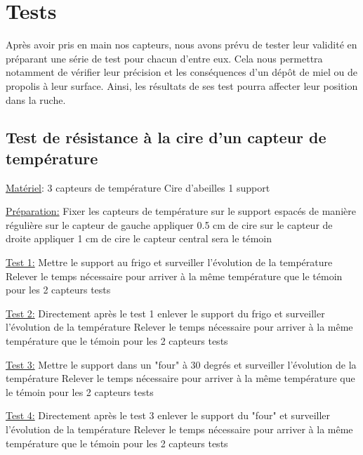 \chapter{Tests}

Après avoir pris en main nos capteurs, nous avons prévu de tester leur validité en préparant une série de test pour chacun d'entre eux. Cela nous permettra notamment de vérifier leur précision et les conséquences d'un dépôt de miel ou de propolis à leur surface. Ainsi, les résultats de ses test pourra affecter leur position dans la ruche. 

\section{Test de résistance à la cire d'un capteur de température}

\noindent \underline{Matériel}:  
3 capteurs de température  
Cire d'abeilles  
1 support\newline  

\noindent \underline{Préparation:} \newline 
Fixer les capteurs de température sur le support espacés de manière régulière sur le capteur de gauche appliquer 0.5 cm de cire sur le capteur de droite appliquer 1 cm de cire le capteur central sera le témoin \newline

\noindent \underline{Test 1:} \newline 
Mettre le support au frigo et surveiller l'évolution de la température\newline   
Relever le temps nécessaire pour arriver à la même température que le témoin pour les 2 capteurs tests  

\noindent \underline{Test 2:}  \newline 
Directement après le test 1 enlever le support du frigo et surveiller l'évolution de la température\newline   
Relever le temps nécessaire pour arriver à la même température que le témoin pour les 2 capteurs tests

\noindent \underline{Test 3:}  \newline 
Mettre le support dans un "four" à 30 degrés et surveiller l'évolution de la température\newline   
Relever le temps nécessaire pour arriver à la même température que le témoin pour les 2 capteurs tests  
  
\noindent \underline{Test 4:}  \newline 
Directement après le test 3 enlever le support du "four" et surveiller l'évolution de la température\newline   
Relever le temps nécessaire pour arriver à la même température que le témoin pour les 2 capteurs tests


